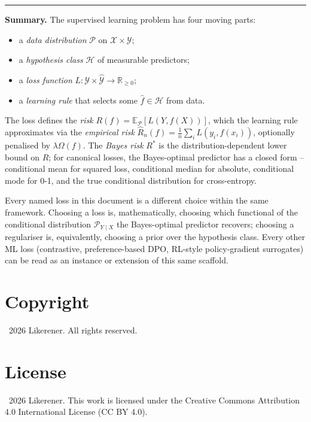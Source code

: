 \documentclass[11pt]{article}
\theoremstyle{definition}
\begin{document}
\bigskip
\hrule
\bigskip

\noindent\textbf{Summary.}
The supervised learning problem has four moving parts:
\begin{itemize}[leftmargin=2em]
  \item a \emph{data distribution} $\mathcal{P}$ on $\mathcal{X} \times \mathcal{Y}$;
  \item a \emph{hypothesis class} $\mathcal{H}$ of measurable predictors;
  \item a \emph{loss function} $L : \mathcal{Y} \times \widehat{\mathcal{Y}}
        \to \mathbb{R}_{\geq 0}$;
  \item a \emph{learning rule} that selects some $\widehat{f} \in \mathcal{H}$
        from data.
\end{itemize}
The loss defines the \emph{risk}
$R(f) = \mathbb{E}_\mathcal{P}[L(Y, f(X))]$, which the learning rule
approximates via the \emph{empirical risk}
$\widehat{R}_n(f) = \tfrac{1}{n}\sum_i L(y_i, f(x_i))$, optionally penalised
by $\lambda \Omega(f)$. The \emph{Bayes risk} $R^{\ast}$ is the
distribution-dependent lower bound on $R$; for canonical losses, the
Bayes-optimal predictor has a closed form -- conditional mean for squared
loss, conditional median for absolute, conditional mode for 0-1, and the
true conditional distribution for cross-entropy.

Every named loss in this document is a different choice within the same
framework. Choosing a loss is, mathematically, choosing which functional of
the conditional distribution $\mathcal{P}_{Y \mid X}$ the Bayes-optimal
predictor recovers; choosing a regulariser is, equivalently, choosing a
prior over the hypothesis class. Every other ML loss (contrastive,
preference-based DPO, RL-style policy-gradient surrogates) can be read as
an instance or extension of this same scaffold.

\section*{Copyright}

\textcopyright\ 2026 Likerener. All rights reserved.

\section*{License}

\textcopyright\ 2026 Likerener. This work is licensed under the Creative Commons Attribution 4.0 International License (CC BY 4.0).
\end{document}
